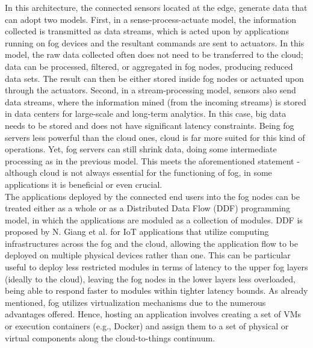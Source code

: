 \noindent\tab In this architecture, the connected sensors located at the edge, generate data that can adopt two models. First, in a sense-process-actuate model, the information collected is transmitted as data streams, which is acted upon by applications running on fog devices and the resultant commands are sent to actuators. In this model, the raw data collected often does not need to be transferred to the cloud; data can be processed, filtered, or aggregated in fog nodes, producing reduced data sets. The result can then be either stored inside fog nodes or actuated upon through the actuators. Second, in a stream-processing model, sensors also send data streams, where the information mined (from the incoming streams) is stored in data centers for large-scale and long-term analytics. In this case, big data needs to be stored and does not have significant latency constraints. Being fog servers less powerful than the cloud ones, cloud is far more suited for this kind of operations. Yet, fog servers can still shrink data, doing some intermediate processing as in the previous model. This meets the aforementioned statement - although cloud is not always essential for the functioning of fog, in some applications it is beneficial or even crucial.\\
\noindent\tab The applications deployed by the connected end users into the fog nodes can be treated either as a whole or as a Distributed Data Flow (DDF) programming model, in which the applications are moduled as a collection of modules. DDF is proposed by N. Giang et al. \cite{giang2015developing} for IoT applications that utilize computing infrastructures across the fog and the cloud, allowing the application flow to be deployed on multiple physical devices rather than one. This can be particular useful to deploy less restricted modules in terms of latency to the upper fog layers (ideally to the cloud), leaving the fog nodes in the lower layers less overloaded, being able to respond faster to modules within tighter latency bounds. As already mentioned, fog utilizes virtualization mechanisms due to the numerous advantages offered. Hence, hosting an application involves creating a set of VMs or execution containers (e.g., Docker) and assign them to a set of physical or virtual components along the cloud-to-things continuum.

